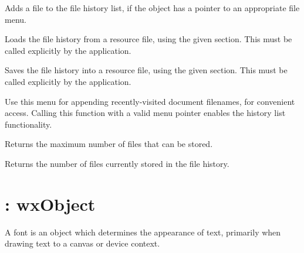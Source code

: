 

Adds a file to the file history list, if the object has a pointer to an appropriate file menu.



Loads the file history from a resource file, using the given section. This must be called
explicitly by the application.



Saves the file history into a resource file, using the given section. This must be called
explicitly by the application.



Use this menu for appending recently-visited document filenames, for convenient
access. Calling this function with a valid menu pointer enables the history
list functionality.



Returns the maximum number of files that can be stored.



Returns the number of files currently stored in the file history.


\section{: wxObject}\label{wxfont}


A font is an object which determines the appearance of text, primarily
when drawing text to a canvas or device context.

\label{wxfontwxfont}


